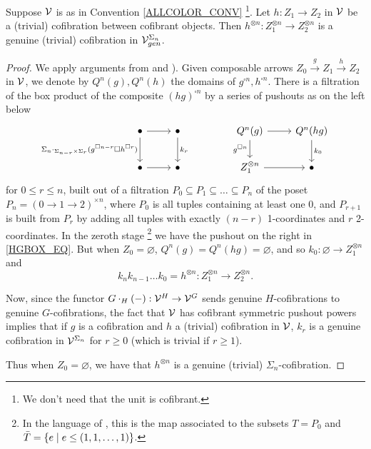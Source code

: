 \documentclass[a4paper,10pt
,draft
]{article}%
\renewcommand{\1}{\eta}%
\begin{document}
\begin{lemma}
      Suppose $\mathcal V$ is as in Convention \ref{ALLCOLOR_CONV} \footnote{
        We don't need that the unit is cofibrant.}.
      Let $h: Z_1 \to Z_2$ in $\mathcal V$ be a (trivial) cofibration between cofibrant objects.
      Then $h^{\otimes n}: Z_1^{\otimes n} \to Z_2^{\otimes n}$ is a genuine (trivial) cofibration in $\mathcal V^{\Sigma_n}_{gen}$.
\end{lemma}
\begin{proof}
      We apply arguments from \cite[Prop. 6.24]{BP_geo} and \cite[Lemma 4.8]{Pe16}).
      Given composable arrows $Z_0 \xrightarrow{g} Z_1 \xrightarrow{h} Z_2$ in $\mathcal V$,
      we denote by $Q^n(g), Q^n(h)$ the domains of $g^{\square n}, h^{\square n}$.
      There is a filtration of the box product of the composite $(hg)^{\square n}$ by a series of pushouts as on the left below
      \begin{equation}
            \label{HGBOX_EQ}
            \begin{tikzcd}
                  \bullet \arrow[d, "\Sigma_n \cdot_{\Sigma_{n-r} \times \Sigma_r} (g^{\square n-r} \square h^{\square r})"'] \arrow[r]
                  &
                  \bullet \arrow[d, "k_r"]
                  & &%
                  Q^n(g) \arrow[r] \arrow[d, "g^{\square n}"']
                  &
                  Q^n(hg) \arrow[d, "k_0"]
                  \\
                  \bullet \arrow[r]
                  &
                  \bullet
                  & &%
                  Z_1^{\otimes n} \arrow[r]
                  &
                  \bullet
            \end{tikzcd}
      \end{equation}
      for $0 \leq r \leq n$,
      built out of a filtration $P_0 \subseteq P_1 \subseteq \dots \subseteq P_n$ of the poset $P_n = (0 \to 1 \to 2)^{\times n}$,
      where $P_0$ is all tuples containing at least one 0, and
      $P_{r+1}$ is built from $P_r$ by adding all tuples with exactly $(n-r)$ 1-coordinates and $r$ 2-coordinates.
      In the zeroth stage \footnote{
        In the language of \cite[Lemma 4.8]{Pe16}, this is the map associated to the subsets
        $T = P_0$ and $\bar T = \left\{ e \;|\; e \leq (1,1,\dots,1)\right\}$.}
      we have the pushout on the right in \eqref{HGBOX_EQ}.
      But when $Z_0 = \varnothing$, $Q^n(g) = Q^n(hg) = \varnothing$, and so
      $k_0: \varnothing \to Z_1^{\otimes n}$ and
      \[
            k_n k_{n-1} \dots k_0 = h^{\otimes n}: Z_1^{\otimes n} \to Z_2^{\otimes n}.
      \]

      Now, since the functor $G \cdot_H (-): \mathcal V^H \to \mathcal V^G$ sends genuine $H$-cofibrations to genuine $G$-cofibrations,
      the fact that $\mathcal V$ has cofibrant symmetric pushout powers implies that
      if $g$ is a cofibration and $h$ a (trivial) cofibration in $\mathcal V$,
      $k_r$ is a genuine cofibration in $\mathcal V^{\Sigma_n}$ for $r \geq 0$ (which is trivial if $r \geq 1$).

      Thus when $Z_0 = \varnothing$, we have that $h^{\otimes n}$ is a genuine (trivial) $\Sigma_n$-cofibration.
\end{proof}
\end{document}
